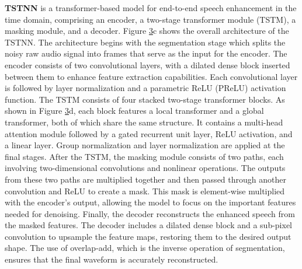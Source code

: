 \documentclass[10pt]{wlscirep}
\begin{document}
\textbf{TSTNN} is a transformer-based model for end-to-end speech enhancement in the time domain, comprising an encoder, a two-stage transformer module (TSTM), a masking module, and a decoder. Figure \hyperref[fig:3]{3}c shows the overall architecture of the TSTNN. The architecture begins with the segmentation stage which splits the noisy raw audio signal into frames that serve as the input for the encoder. The encoder consists of two convolutional layers, with a dilated dense block inserted between them to enhance feature extraction capabilities. Each convolutional layer is followed by layer normalization and a parametric ReLU (PReLU) activation function. The TSTM consists of four stacked two-stage transformer blocks. As shown in Figure \hyperref[fig:3]{3}d, each block features a local transformer and a global transformer, both of which share the same structure. It contains a multi-head attention module followed by a gated recurrent unit layer, ReLU activation, and a linear layer. Group normalization and layer normalization are applied at the final stages. After the TSTM, the masking module consists of two paths, each involving two-dimensional convolutions and nonlinear operations. The outputs from these two paths are multiplied together and then passed through another convolution and ReLU to create a mask. This mask is element-wise multiplied with the encoder's output, allowing the model to focus on the important features needed for denoising. Finally, the decoder reconstructs the enhanced speech from the masked features. The decoder includes a dilated dense block and a sub-pixel convolution to upsample the feature maps, restoring them to the desired output shape. The use of overlap-add, which is the inverse operation of segmentation, ensures that the final waveform is accurately reconstructed.
\end{document}
